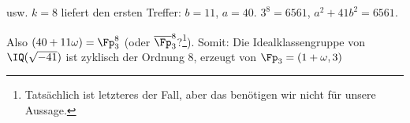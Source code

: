\begin{Beispiel}
\begin{enumerate}
 usw. $k=8$ liefert den ersten Treffer: $b=11$, $a=40$. $3^8=6561$, $a^2+41b^2=6561$.
 
 Also $(40+11\omega)=\Fp_3^8$ (oder $\overline\Fp_3^8$?\footnote{Tatsächlich ist letzteres der Fall, aber das benötigen wir nicht für unsere Aussage.}). Somit: Die Idealklassengruppe von $\IQ(\sqrt{-41})$ ist zyklisch der Ordnung $8$, erzeugt von $\Fp_3=(1+\omega,3)$

  \end{enumerate}

 \end{Beispiel}






